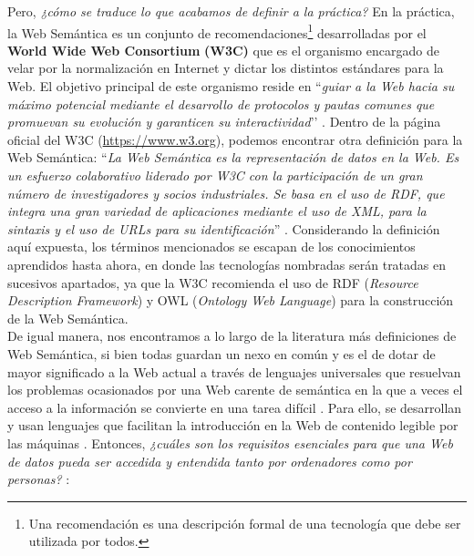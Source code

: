 Pero, \textit{¿cómo se traduce lo que acabamos de definir a la práctica?} En la práctica, la Web Semántica es un conjunto de recomendaciones\footnote{Una recomendación es una descripción formal de una tecnología que debe ser utilizada por todos.} desarrolladas por el \textbf{World Wide Web Consortium}\textbf{ (W3C) }que es el organismo encargado de velar por la normalización en Internet y dictar los distintos estándares para la Web. El objetivo principal de este organismo reside en ``\textit{guiar a la Web hacia su máximo potencial mediante el desarrollo de protocolos y pautas comunes que promuevan su evolución y garanticen su interactividad}’’ \cite{coursera, web-semantica-w3c}. Dentro de la página oficial del W3C (\url{https://www.w3.org}), podemos encontrar otra definición para la Web Semántica: ``\textit{La Web Semántica es la representación de datos en la Web. Es un esfuerzo colaborativo liderado por W3C con la participación de un gran número de investigadores y socios industriales. Se basa en el uso de RDF, que integra una gran variedad de aplicaciones mediante el uso de XML, para la sintaxis y el uso de URLs para su identificación}'' \cite{semantica-web}. Considerando la definición aquí expuesta, los términos mencionados se escapan de los conocimientos aprendidos hasta ahora, en donde las tecnologías nombradas serán tratadas en sucesivos apartados, ya que la W3C recomienda el uso de RDF (\textit{Resource Description Framework}) y OWL (\textit{Ontology Web Language}) para la construcción de la Web Semántica.\\

De igual manera, nos encontramos a lo largo de la literatura más definiciones de Web Semántica, si bien todas guardan un nexo en común y es el de dotar de mayor significado a la Web actual a través de lenguajes universales que resuelvan los problemas ocasionados por una Web carente de semántica en la que a veces el acceso a la información se convierte en una tarea difícil \cite{introduccion}. Para ello, se desarrollan y usan lenguajes que facilitan la introducción en la Web de contenido legible por las máquinas \cite{tesis}. Entonces, \textit{¿cuáles son los requisitos esenciales para que una Web de datos pueda ser accedida y entendida tanto por ordenadores como por personas?} \cite{coursera}:

